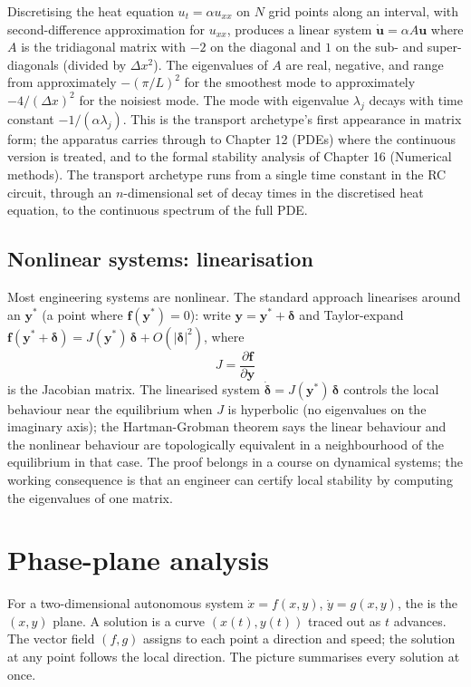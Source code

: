 Discretising the heat equation $u_{t} = \alpha u_{xx}$ on $N$ grid
points along an interval, with second-difference approximation for
$u_{xx}$, produces a linear system $\dot{\mathbf{u}} = \alpha A
\mathbf{u}$ where $A$ is the tridiagonal matrix with $-2$ on the
diagonal and $1$ on the sub- and super-diagonals (divided by
$\Delta x^{2}$). The eigenvalues of $A$ are real, negative, and
range from approximately $-(\pi/L)^{2}$ for the smoothest mode to
approximately $-4/(\Delta x)^{2}$ for the noisiest mode. The mode
with eigenvalue $\lambda_{j}$ decays with time constant $-1/(\alpha
\lambda_{j})$. This is the transport archetype's first appearance
in matrix form; the apparatus carries through to Chapter 12 (PDEs)
where the continuous version is treated, and to the formal stability
analysis of Chapter 16 (Numerical methods). The transport archetype
runs from a single time constant in the RC circuit, through an
$n$-dimensional set of decay times in the discretised heat equation,
to the continuous spectrum of the full PDE.

\subsection{Nonlinear systems: linearisation}

Most engineering systems are nonlinear. The standard approach
linearises around an  $\mathbf{y}^{*}$ (a point
where $\mathbf{f}(\mathbf{y}^{*}) = 0$): write $\mathbf{y} =
\mathbf{y}^{*} + \mathbf{\delta}$ and Taylor-expand
$\mathbf{f}(\mathbf{y}^{*} + \mathbf{\delta}) =
J(\mathbf{y}^{*})\,\mathbf{\delta} + O(|\mathbf{\delta}|^{2})$,
where
\[
J = \frac{\partial \mathbf{f}}{\partial \mathbf{y}}
\]
is the Jacobian matrix. The linearised system $\dot{\mathbf{\delta}} =
J(\mathbf{y}^{*})\,\mathbf{\delta}$ controls the local behaviour
near the equilibrium when $J$ is hyperbolic (no eigenvalues on the
imaginary axis); the Hartman-Grobman theorem says the linear
behaviour and the nonlinear behaviour are topologically equivalent
in a neighbourhood of the equilibrium in that case. The proof
belongs in a course on dynamical systems; the working consequence
is that an engineer can certify local stability by computing the
eigenvalues of one matrix.

\section{Phase-plane analysis}

For a two-dimensional autonomous system $\dot{x} = f(x, y)$,
$\dot{y} = g(x, y)$, the  is the $(x, y)$
plane. A solution is a curve $(x(t), y(t))$ traced out as $t$
advances. The vector field $(f, g)$ assigns to each point a
direction and speed; the solution at any point follows the local
direction. The picture summarises every solution at once.

